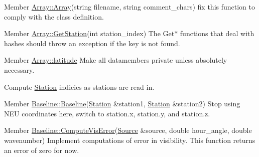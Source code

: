 \label{todo__todo000001}
\hypertarget{todo__todo000001}{}
 
\begin{DoxyDescription}
\item[Member \hyperlink{classArray_a4a5d472a84870d72b3d67edec898bcfa}{Array::Array}(string filename, string comment\_\-chars) ]fix this function to comply with the class definition. 
\end{DoxyDescription}

\label{todo__todo000003}
\hypertarget{todo__todo000003}{}
 
\begin{DoxyDescription}
\item[Member \hyperlink{classArray_acb9ecf27c0fe2ad73e15c34f80d90c5c}{Array::GetStation}(int station\_\-index) ]The Get$\ast$ functions that deal with hashes should throw an exception if the key is not found. 
\end{DoxyDescription}

\label{todo__todo000002}
\hypertarget{todo__todo000002}{}
 
\begin{DoxyDescription}
\item[Member \hyperlink{classArray_a3d0a097d6c7d27ab0ba7b72a9b2223e1}{Array::latitude} ]Make all datamembers private unless absolutely necessary. 

Compute \hyperlink{classStation}{Station} indicies as stations are read in. 
\end{DoxyDescription}

\label{todo__todo000004}
\hypertarget{todo__todo000004}{}
 
\begin{DoxyDescription}
\item[Member \hyperlink{classBaseline_acb78f3f6c2020cc0c9cc923ddb6a2133}{Baseline::Baseline}(\hyperlink{classStation}{Station} \&station1, \hyperlink{classStation}{Station} \&station2) ]Stop using NEU coordinates here, switch to station.x, station.y, and station.z. 
\end{DoxyDescription}

\label{todo__todo000006}
\hypertarget{todo__todo000006}{}
 
\begin{DoxyDescription}
\item[Member \hyperlink{classBaseline_ab5374e1c77d1da0cd8d13dfff39f5877}{Baseline::ComputeVisError}(\hyperlink{classSource}{Source} \&source, double hour\_\-angle, double wavenumber) ]Implement computations of error in visibility. This function returns an error of zero for now. 
\end{DoxyDescription}


